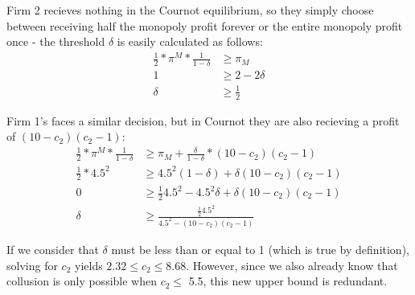 \documentclass[12pt,letterpaper]{article}
\begin{document}
\begin{enumerate}
\begin{enumerate}
	Firm 2 recieves nothing in the Cournot equilibrium, so they simply choose between receiving half the monopoly profit forever or the entire monopoly profit once - the threshold $\delta$ is easily calculated as follows:
	\begin{align*}
		\frac{1}{2} * \pi^M * \frac{1}{1-\delta} &\geq \pi_M \\
		1 &\geq 2 - 2\delta \\
		\delta &\geq \frac{1}{2}
	\end{align*}

	Firm 1's faces a similar decision, but in Cournot they are also recieving a profit of $(10-c_2)(c_2-1)$:
	\begin{align*}
		\frac{1}{2} * \pi^M * \frac{1}{1-\delta} &\geq \pi_M + \frac{\delta}{1-\delta} * (10-c_2)(c_2-1) \\
		\frac{1}{2} * 4.5^2 &\geq 4.5^2 (1-\delta) + \delta (10-c_2)(c_2-1) \\
		0 &\geq \frac{1}{2} 4.5^2 - 4.5^2\delta + \delta (10-c_2)(c_2-1) \\
		\delta &\geq \frac{\frac{1}{2}4.5^2}{4.5^2 - (10-c_2)(c_2-1)}
	\end{align*}

	If we consider that $\delta$ must be less than or equal to 1 (which is true by definition), solving for $c_2$ yields $2.32 \leq c_2 \leq 8.68$. However, since we also already know that collusion is only possible when $c_2 \leq$ 5.5, this new upper bound is redundant. 
\end{enumerate} 


\end{enumerate}
\end{document}
